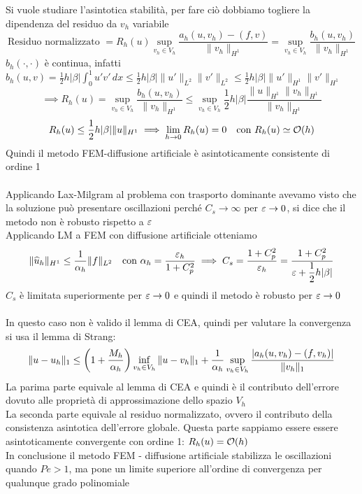 \documentclass{article}
\begin{document}
Si vuole studiare l'asintotica stabilità, per fare ciò dobbiamo togliere la dipendenza del residuo da $v_h$ variabile
\[
\text{Residuo normalizzato } = R_h(u) \sup_{v_h\in V_h}\frac{a_{h}(u,v_h)-(f,v)}{\|v_h\|_{H^1}} = \sup_{v_h\in V_h}\frac{b_h(u,v_h)}{\|v_h\|_{H^1}}
\]
$b_h(\cdot,\cdot)$ è continua, infatti $b_h(u,v)=\frac12h|\beta| \int_0^1u'v'\, dx \le \frac12 h|\beta|\|u'\|_{L^2}\|v'\|_{L^2}\le \frac12 h|\beta|\|u'\|_{H^1}\|v'\|_{H^1}$
\[
\implies R_h(u)= \sup_{v_h\in V_h}\frac{b_h(u,v_h)}{\|v_h\|_{H^1}} \le \sup_{v_h\in V_h} \frac12 h |\beta| \frac{\|u\|_{H^1}\|v_h\|_{H^1}}{\|v_h\|_{H^1}}
\]
\[
R_h(u)\le \dfrac12 h|\beta|\|u\|_{H^1} \implies \lim_{h\to0} R_h(u)=0 \ \ \text{ con } R_h(u)\simeq \mathcal O(h)
\]
Quindi il metodo FEM-diffusione artificiale è asintoticamente consistente di ordine 1\\ \\

Applicando Lax-Milgram al problema con trasporto dominante avevamo visto che la soluzione può presentare oscillazioni perché $C_s\to \infty$ per $\varepsilon \to0$, si dice che il metodo non è robusto rispetto a $\varepsilon$\\

Applicando LM a FEM con diffusione artificiale otteniamo
\[
\|\widehat{u}_h\|_{H^1}\le \dfrac{1}{\alpha_h}\|f\|_{L^2} \ \ \text{ con } \alpha_h = \dfrac{\varepsilon_h}{1+C_p^2} \implies C_s = \dfrac{1+C_p^2}{\varepsilon_h}= \dfrac{1+C_p^2}{\varepsilon + \dfrac12 h|\beta|}
\]
$C_s$ è limitata superiormente per $\varepsilon\to0$ e quindi il metodo è robusto per $\varepsilon\to0$\\ \\

In questo caso non è valido il lemma di CEA, quindi per valutare la convergenza si usa il lemma di Strang:
\[
\|u-u_h\|_1 \le \O1+ \frac{M_h}{\alpha_h}\C \inf_{v_h\in V_h}\|u-v_h\|_1 + \frac{1}{\alpha_h}\sup_{v_h\in V_h} \frac{|a_h(u,v_h)-(f,v_h)|}{\|v_h\|_1}\skipp
\]
La parima parte equivale al lemma di CEA e quindi è il contributo dell'errore dovuto alle proprietà di approssimazione dello spazio $V_h$\\
La seconda parte equivale al residuo normalizzato, ovvero il contributo della consistenza asintotica dell'errore globale. Questa parte sappiamo essere essere asintoticamente convergente con ordine 1: $R_h(u)=\mathcal O(h)$\\

In conclusione il metodo FEM - diffusione artificiale stabilizza le oscillazioni quando $Pe>1$, ma pone un limite superiore all'ordine di convergenza per qualunque grado polinomiale \\
\end{document}
